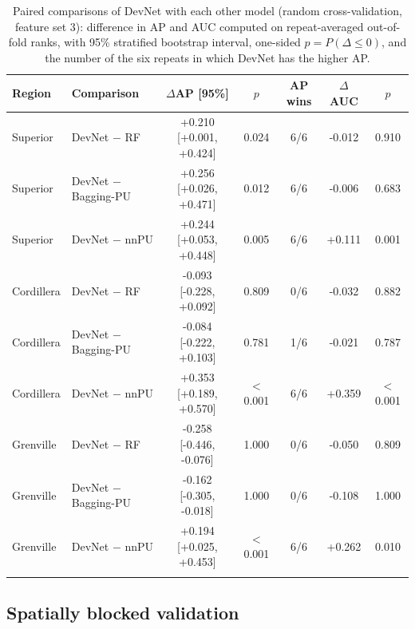 \documentclass[pdflatex,sn-apa]{sn-jnl}
\begin{document}
\begin{table}[t]
\caption{Paired comparisons of DevNet with each other model (random cross-validation, feature set 3): difference in AP and AUC computed on repeat-averaged out-of-fold ranks, with 95\% stratified bootstrap interval, one-sided $p = P(\Delta \leq 0)$, and the number of the six repeats in which DevNet has the higher AP.}\label{tab:bootstrap}
\footnotesize
\setlength{\tabcolsep}{2.5pt}
\begin{tabular*}{\textwidth}{@{\extracolsep\fill}llccccc}
\toprule
Region & Comparison & $\Delta$AP [95\%] & $p$ & AP wins & $\Delta$AUC & $p$ \\
\midrule
Superior & DevNet $-$ RF & +0.210 [+0.001, +0.424] & 0.024 & 6/6 & -0.012 & 0.910 \\
Superior & DevNet $-$ Bagging-PU & +0.256 [+0.026, +0.471] & 0.012 & 6/6 & -0.006 & 0.683 \\
Superior & DevNet $-$ nnPU & +0.244 [+0.053, +0.448] & 0.005 & 6/6 & +0.111 & 0.001 \\
\addlinespace
Cordillera & DevNet $-$ RF & -0.093 [-0.228, +0.092] & 0.809 & 0/6 & -0.032 & 0.882 \\
Cordillera & DevNet $-$ Bagging-PU & -0.084 [-0.222, +0.103] & 0.781 & 1/6 & -0.021 & 0.787 \\
Cordillera & DevNet $-$ nnPU & +0.353 [+0.189, +0.570] & $<$0.001 & 6/6 & +0.359 & $<$0.001 \\
\addlinespace
Grenville & DevNet $-$ RF & -0.258 [-0.446, -0.076] & 1.000 & 0/6 & -0.050 & 0.809 \\
Grenville & DevNet $-$ Bagging-PU & -0.162 [-0.305, -0.018] & 1.000 & 0/6 & -0.108 & 1.000 \\
Grenville & DevNet $-$ nnPU & +0.194 [+0.025, +0.453] & $<$0.001 & 6/6 & +0.262 & 0.010 \\
\botrule
\end{tabular*}
\end{table}

\subsection{Spatially blocked validation}\label{sec:res-spatial}
\end{document}
